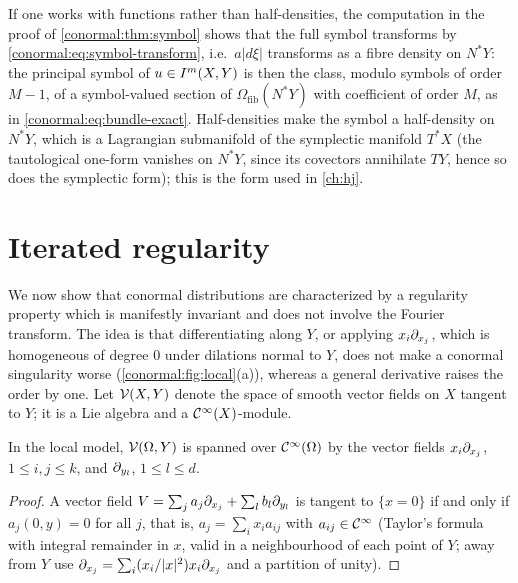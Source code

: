 \begin{remark}\label{conormal:rem:scalar}
  If one works with functions rather than half-densities, the computation in the
  proof of \cref{conormal:thm:symbol} shows that the full symbol transforms by
  \eqref{conormal:eq:symbol-transform}, i.e.\ $a|d\xi|$ transforms as a fibre
  density on $N^*Y$: the principal symbol of $u\in I^{m}(X,Y)$ is then the
  class, modulo symbols of order $M-1$, of a symbol-valued section of
  $\Omega_{\mathrm{fib}}(N^*Y)$ with coefficient of order $M$, as in
  \eqref{conormal:eq:bundle-exact}.  Half-densities make the symbol a
  half-density on $N^*Y$, which is a Lagrangian submanifold of the symplectic
  manifold $T^*X$ (the tautological one-form vanishes on $N^*Y$, since its
  covectors annihilate $TY$, hence so does the symplectic form); this is the
  form used in \cref{ch:hj}.
\end{remark}

\section{Iterated regularity}\label{conormal:sec:iterated}

We now show that conormal distributions are characterized by a regularity
property which is manifestly invariant and does not involve the Fourier
transform.  The idea is that differentiating along $Y$, or applying
$x_i\partial_{x_j}$, which is homogeneous of degree $0$ under dilations normal to $Y$,
does not make a conormal singularity worse
(\cref{conormal:fig:local}(a)), whereas a general derivative raises the order
by one.  Let $\mathcal{V}(X,Y)$ denote the space of smooth vector fields on $X$
tangent to $Y$; it is a Lie algebra and a $\mathcal{C}^\infty(X)$-module.

\begin{lemma}\label{conormal:lem:generators}
  In the local model, $\mathcal{V}(\Omega,Y)$ is spanned over $\mathcal{C}^\infty(\Omega)$ by the
  vector fields $x_i\partial_{x_j}$, $1\le i,j\le k$, and $\partial_{y_l}$, $1\le l\le d$.
\end{lemma}
\begin{proof}
  A vector field $V=\sum_ja_j\partial_{x_j}+\sum_lb_l\partial_{y_l}$ is tangent to
  $\{x=0\}$ if and only if $a_j(0,y)=0$ for all $j$, that is, $a_j=\sum_i
  x_ia_{ij}$ with $a_{ij}\in\mathcal{C}^\infty$ (Taylor's formula with integral remainder in $x$,
  valid in a neighbourhood of each point of $Y$; away from $Y$ use
  $\partial_{x_j}=\sum_i(x_i/|x|^2)x_i\partial_{x_j}$ and a partition of unity).
\end{proof}


